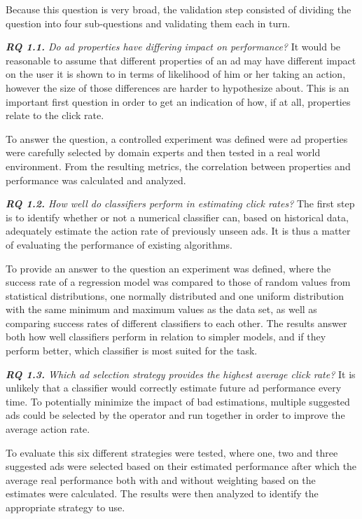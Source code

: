 \documentclass{sig-alternate}
\begin{document}
Because this question is very broad, the validation step consisted of dividing the question into four sub-questions and validating them each in turn.

\textit{\textbf{RQ 1.1.} Do ad properties have differing impact on performance?}
It would be reasonable to assume that different properties of an ad may have different impact on the user it is shown to in terms of likelihood of him or her taking an action, however the size of those differences are harder to hypothesize about. This is an important first question in order to get an indication of how, if at all, properties relate to the click rate.

To answer the question, a controlled experiment was defined were ad properties were carefully selected by domain experts and then tested in a real world environment. From the resulting metrics, the correlation between properties and performance was calculated and analyzed.

\textit{\textbf{RQ 1.2.} How well do classifiers perform in estimating click rates?}
The first step is to identify whether or not a numerical classifier can, based on historical data, adequately estimate the action rate of previously unseen ads. It is thus a matter of evaluating the performance of existing algorithms.

To provide an answer to the question an experiment was defined, where the success rate of a regression model was compared to those of random values from statistical distributions, one normally distributed and one uniform distribution with the same minimum and maximum values as the data set, as well as comparing success rates of different classifiers to each other. The results answer both how well classifiers perform in relation to simpler models, and if they perform better, which classifier is most suited for the task.

\textit{\textbf{RQ 1.3.} Which ad selection strategy provides the highest average click rate?}
It is unlikely that a classifier would correctly estimate future ad performance every time. To potentially minimize the impact of bad estimations, multiple suggested ads could be selected by the operator and run together in order to improve the average action rate.

To evaluate this six different strategies were tested, where one, two and three suggested ads were selected based on their estimated performance after which the average real performance both with and without weighting based on the estimates were calculated. The results were then analyzed to identify the appropriate strategy to use.
\end{document}
